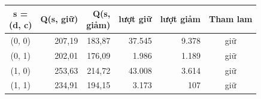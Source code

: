 \begin{tabular}{crrrrc}
\toprule
\makecell[c]{s =\\(d, c)} & Q(s, giữ) & \makecell[r]{Q(s,\\giảm)} & lượt giữ & lượt giảm & Tham lam \\
\midrule
(0, 0) & 207{,}19 & 183{,}87 & 37{.}545 & 9{.}378 & giữ \\
(0, 1) & 202{,}01 & 176{,}09 & 1{.}986 & 1{.}189 & giữ \\
(1, 0) & 253{,}63 & 214{,}72 & 43{.}008 & 3{.}614 & giữ \\
(1, 1) & 234{,}91 & 194{,}15 & 3{.}173 & 107 & giữ \\
\bottomrule
\end{tabular}
